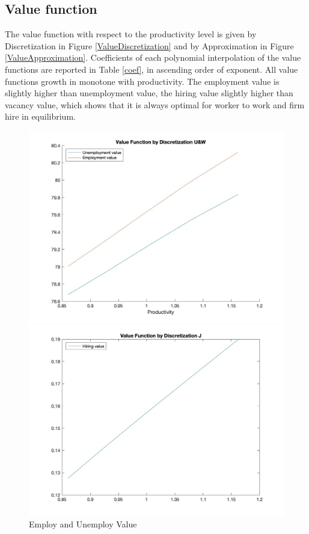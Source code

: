 \documentclass[10pt]{article} %
\begin{document}
        \subsection{Value function}
        The value function with respect to the productivity level is given by Discretization in Figure \ref{ValueDiscretization} and by Approximation in Figure \ref{ValueApproximation}. Coefficients of each polynomial interpolation of the value functions are reported in Table \ref{coef}, in ascending order of exponent. All value functions growth in monotone with productivity. The employment value is slightly higher than unemployment value, the hiring value slightly higher than vacancy value, which shows that it is always optimal for worker to work and firm hire in equilibrium.

        \begin{figure}
            \centering
            \begin{minipage}{.5\textwidth}
              \centering
              \includegraphics[width=\linewidth]{ValueUWDiscretization}
              \caption{Employ and Unemploy Value}
            \end{minipage}%
            \begin{minipage}{.5\textwidth}
              \centering
              \includegraphics[width=\linewidth]{ValueJDiscretization}

\end{minipage}
\end{figure}
\end{document}
